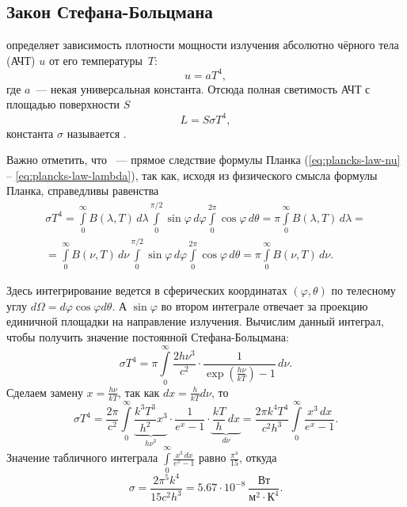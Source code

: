 \subsection{Закон Стефана-Больцмана}
 определяет зависимость плотности мощности излучения абсолютно чёрного тела (АЧТ) $u$ от его температуры~$T$:
\begin{equation}
	u = a T^4,
\end{equation}
где $a$~--- некая универсальная константа.
Отсюда полная светимость АЧТ с площадью поверхности $S$
\begin{equation}
	L = S \sigma T^4,
	\label{eq:steff-bol-law}
\end{equation}
константа $\sigma$ называется .

Важно отметить, что ~--- прямое следствие формулы Планка (\ref{eq:plancks-law-nu} -- \ref{eq:plancks-law-lambda}), так как, исходя из физического смысла формулы Планка, справедливы равенства
\begin{multline}
	\sigma T^4 
	= \int\limits^\infty_0 B(\lambda, T) \,d \lambda \int\limits_0^{\pi/2} \sin \varphi \,d \varphi \int\limits_0^{2\pi} \cos \varphi \,d \theta 
	= \pi \int\limits^\infty_0 B(\lambda, T) \,d \lambda =\\
	= \int\limits^\infty_0 B(\nu, T) \,d \nu \int\limits_0^{\pi/2} \sin \varphi \,d \varphi \int\limits_0^{2\pi} \cos \varphi \,d \theta 
	= \pi \int\limits^\infty_0 B(\nu, T) \,d \nu.
\end{multline}

Здесь интегрирование ведется в сферических координатах $(\varphi, \theta)$ по телесному углу $d\Omega = d\varphi \cos \varphi d\theta$. А $\sin \varphi$ во втором интеграле отвечает за проекцию единичной площадки на направление излучения. Вычислим данный интеграл, чтобы получить значение постоянной Стефана-Больцмана:
\begin{equation*}
	\sigma T^4 = \pi \int\limits_0^{\infty} \frac{2h\nu^3}{c^2}\cdot \frac{1}{\exp\left(\frac{h\nu}{kT}\right)-1} \,d \nu.
\end{equation*}
Сделаем замену $x = \frac{h \nu}{k T}$, так как $dx = \frac{h}{k T} d\nu$, то
\begin{equation*}
	\sigma T^4 = \frac{2\pi}{c^2}  \int\limits_0^{\infty} \underbrace{\frac{k^3 T^3}{h^2} x^3}_{h\nu^3} \cdot \frac{1}{e^x - 1} \cdot \underbrace{\frac{kT}{h} \,d x}_{d\nu} = \frac{2 \pi k^4 T^4}{c^2 h^3} \int\limits_0^{\infty} \frac{x^3 \,d x}{e^x - 1}.
\end{equation*}
Значение табличного интеграла $\int\limits_0^{\infty} \frac{x^3 \,d x}{e^x - 1}$ равно $\frac{\pi^4}{15}$, откуда
\begin{equation*}
	\sigma = \frac{2 \pi^5 k^4}{15 c^2 h^3} = 5.67 \cdot 10^{-8}~\frac{\text{Вт}}{\text{м}^2 \cdot \text{К}^4}.
\end{equation*}

